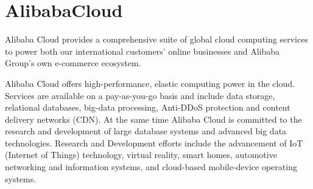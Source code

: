 \section{AlibabaCloud}
 Alibaba Cloud provides a comprehensive suite of global cloud computing services to power both our international customers’ online businesses and Alibaba Group’s own e-commerce ecosystem.

Alibaba Cloud offers high-performance, elastic computing power in the cloud. Services are available on a pay-as-you-go basis and include data storage, relational databases, big-data processing, Anti-DDoS protection and content delivery networks (CDN). At the same time Alibaba Cloud is committed to the research and development of large database systems and advanced big data technologies. Research and Development efforts include the advancement of IoT (Internet of Things) technology, virtual reality, smart homes, automotive networking and information systems, and cloud-based mobile-device operating systems. \cite{AlibabaCloud}